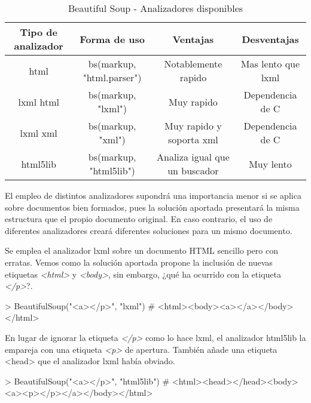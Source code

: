 \begin{table}[h]
  \begin{center}
  \begin{tabular}{| c | c | c | c |}
  \hline \textbf{Tipo de analizador} & \textbf{Forma de uso} & \textbf{Ventajas} & \textbf{Desventajas} \\ \hline
  html & bs(markup, "html.parser") & Notablemente rapido & Mas lento que lxml \\
  lxml html & bs(markup, "lxml") & Muy rapido & Dependencia de C \\
  lxml xml & bs(markup, "xml") & Muy rapido y soporta xml & Dependencia de C \\
  html5lib & bs(markup, "html5lib") & Analiza igual que un buscador & Muy lento \\ \hline
  \end{tabular}
  \caption{Beautiful Soup - Analizadores disponibles}
  \label{tab:beautiful soup - analizadores disponibles}
  \end{center}
\end{table}

El empleo de distintos analizadores supondrá una importancia menor si se aplica sobre documentos bien 
formados, pues la solución aportada presentará la misma estructura que el propio documento original. En 
caso contrario, el uso de diferentes analizadores creará diferentes soluciones para un mismo documento. 

Se emplea el analizador lxml sobre un documento HTML sencillo pero con erratas. Vemos como la solución 
aportada propone la inclusión de nuevas etiquetas \emph{<html>} y \emph{<body>}, sin embargo, ¿qué ha 
ocurrido con la etiqueta \emph{</p>}?.

\begin{Schunk}
  \begin{Soutput}
    > BeautifulSoup("<a></p>", "lxml")
    # <html><body><a></a></body></html>
  \end{Soutput}
\end{Schunk}

En lugar de ignorar la etiqueta \emph{</p>} como lo hace lxml, el analizador html5lib la empareja con una 
etiqueta \emph{<p>} de apertura. También añade una etiqueta <head> que el analizador lxml había obviado.

\begin{Schunk}
  \begin{Soutput}
    > BeautifulSoup("<a></p>", "html5lib")
    # <html><head></head><body><a><p></p></a></body></html>
  \end{Soutput}
\end{Schunk}

